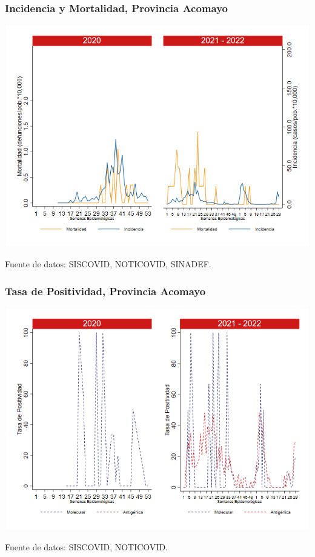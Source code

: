 \documentclass[xcolor=table]{beamer}
\begin{document}
\begin{frame}[label=Acomayo]
	\frametitle{Incidencia y Mortalidad, Provincia Acomayo}
	\vspace{-.5cm}
	\begin{center}
		\includegraphics[width=0.8\linewidth, trim={0cm .5cm 0cm 0.2cm},clip]{../figuras/incidencia_mortalidad_20_21_1.png}
	\end{center}
	{\tiny Fuente de datos: SISCOVID, NOTICOVID, SINADEF.}
\end{frame}

\begin{frame}
	\frametitle{Tasa de Positividad, Provincia Acomayo}
	\vspace{-.5cm}
	\begin{center}
		\includegraphics[width=0.8\linewidth, trim={0cm .5cm 0cm 0.2cm},clip]{../figuras/positividad_20_21_1.png}
	\end{center}
	{\tiny Fuente de datos: SISCOVID, NOTICOVID.}
\end{frame}
\end{document}
